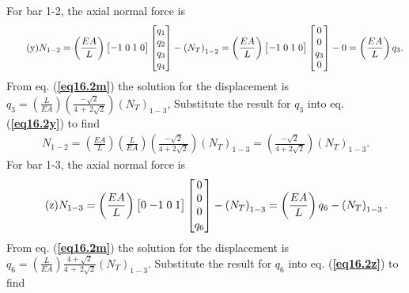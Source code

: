 \documentclass{AeroStructure-ERJohnson}
\begin{document}
\begin{example}
For bar 1-2, the axial normal force is
\begin{align}\label{eq16.2y}\tag{y}
N_{1-2}=\left(\frac{E A}{L}\right)\left[\begin{array}{@{}l@{\;}l@{\;}l@{\;}l@{}}-1 & 0 & 1 & 0\end{array}\right]\left[\begin{array}{@{}l@{}}q_{1} \\q_{2} \\q_{3} \\q_{4}\end{array}\right]-\left(N_{T}\right)_{1-2}=\left(\frac{E A}{L}\right)\left[\begin{array}{@{}l@{\;}l@{\;}l@{\;}l@{}}-1 & 0 & 1 & 0\end{array}\right]\left[\begin{array}{@{}c@{}}0 \\0 \\q_{3} \\0\end{array}\right]-0=\left(\frac{E A}{L}\right) q_{3}.
\end{align}
From eq. (\textbf{\ref{eq16.2m}}) the solution for the displacement is $q_{3}=\left(\frac{L}{E A}\right)\left(\frac{-\sqrt{2}}{4\,{+}\,2 \sqrt{2}}\right)\left(N_{T}\right)_{1-3}$, Substitute the result for $q_3$ into eq. (\textbf{\ref{eq16.2y}}) to find
\begin{align*}
N_{1-2}=\left(\frac{E A}{L}\right)\left(\frac{L}{E A}\right)\left(\frac{-\sqrt{2}}{4+2 \sqrt{2}}\right)\left(N_{T}\right)_{1-3}=\left(\frac{-\sqrt{2}}{4+2 \sqrt{2}}\right)\left(N_{T}\right)_{1-3}.
\end{align*}
For bar 1-3, the axial normal force is
\begin{align}\label{eq16.2z}\tag{z}
N_{1-3}=\left(\frac{E A}{L}\right)\left[\begin{array}{@{}l@{\;}l@{\;}l@{\;}l@{}}0 & -1 & 0 & 1\end{array}\right]\left[\begin{array}{@{}c@{}}0 \\0 \\0 \\q_{6}\end{array}\right]-\left(N_{T}\right)_{1-3}=\left(\frac{E A}{L}\right) q_{6}-\left(N_{T}\right)_{1-3}.
\end{align}
From eq. (\textbf{\ref{eq16.2m}}) the solution for the displacement is $q_{6}=\left(\frac{L}{E A}\right) \frac{4+\sqrt{2}}{4\,{+}\,2 \sqrt{2}}\left(N_{T}\right)_{1-3}$. Substitute the result for $q_6$ into eq. (\textbf{\ref{eq16.2z}}) to find

\end{example}
\end{document}
